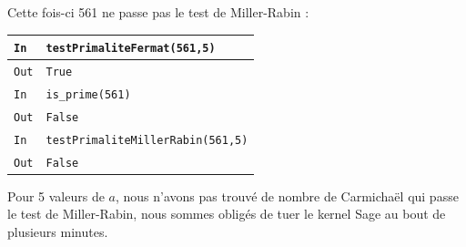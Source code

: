 \documentclass[titlepage]{article}
\begin{document}
    

    Cette fois-ci 561 ne passe pas le test de Miller-Rabin : \bigbreak

    \begin{tabularx}{12cm}{|p{0.60cm}|X|}
        \hline
        \rowcolor{gray}
        \texttt{In}
        & 
        \texttt{testPrimaliteFermat(561,5)}
        \\
        \hline
        \texttt{Out}
        &
        \texttt{True}
        \\
        \hline
        \rowcolor{gray}
        \texttt{In}
        & 
        \texttt{is\_prime(561)}
        \\
        \hline
        \texttt{Out}
        &
        \texttt{False}
        \\
        \hline
        \rowcolor{gray}
        \texttt{In}
        & 
        \texttt{testPrimaliteMillerRabin(561,5)}
        \\
        \hline
        \texttt{Out}
        &
        \texttt{False}
        \\
        \hline
        
    \end{tabularx}
    \bigbreak

    Pour 5 valeurs de $a$, nous n'avons pas trouvé de nombre de Carmichaël qui passe le test de Miller-Rabin, nous sommes obligés de tuer le kernel Sage au bout de plusieurs minutes.
\end{document}

